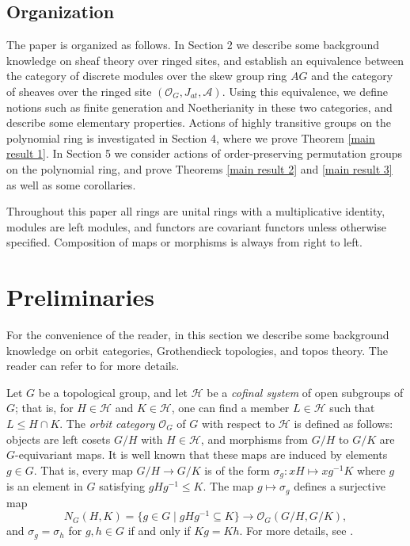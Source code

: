 \documentclass[11pt, reqno]{amsart}
\theoremstyle{plain}
\numberwithin{equation}{section}
\theoremstyle{definition}
\begin{document}
\subsection{Organization}

The paper is organized as follows. In Section 2 we describe some background knowledge on sheaf theory over ringed sites, and establish an equivalence between the category of discrete modules over the skew group ring $AG$ and the category of sheaves over the ringed site $(\mathcal{O}_G, J_{at}, \mathcal{A})$. Using this equivalence, we define notions such as finite generation and Noetherianity in these two categories, and describe some elementary properties. Actions of highly transitive groups on the polynomial ring is investigated in Section 4, where we prove Theorem \ref{main result 1}. In Section 5 we consider actions of order-preserving permutation groups on the polynomial ring, and prove Theorems \ref{main result 2} and \ref{main result 3} as well as some corollaries.

Throughout this paper all rings are unital rings with a multiplicative identity, modules are left modules, and functors are covariant functors unless otherwise specified. Composition of maps or morphisms is always from right to left.


\section{Preliminaries}

For the convenience of the reader, in this section we describe some background knowledge on orbit categories, Grothendieck topologies, and topos theory. The reader can refer to \cite{Ar, AGV, Car, Jo, KS, MM} for more details.

Let $G$ be a topological group, and let $\mathcal{H}$ be a \textit{cofinal system} of open subgroups of $G$; that is, for $H \in \mathcal{H}$ and $K \in \mathcal{H}$, one can find a member $L \in \mathcal{H}$ such that $L \leqslant H \cap K$. The \textit{orbit category} $\mathcal{O}_G$ of $G$ with respect to $\mathcal{H}$ is defined as follows: objects are left cosets $G/H$ with $H \in \mathcal{H}$, and morphisms from $G/H$ to $G/K$ are $G$-equivariant maps. It is well known that these maps are induced by elements $g \in G$. That is, every map $G/H \to G/K$ is of the form $\sigma_g: xH \mapsto xg^{-1}K$ where $g$ is an element in $G$ satisfying $gHg^{-1} \leqslant K$. The map $g \mapsto \sigma_g$ defines a surjective map
\[
N_G(H, K) = \{g \in G \mid gHg^{-1} \subseteq K \} \longrightarrow \mathcal{O}_G(G/H, G/K),
\]
and $\sigma_g = \sigma_h$ for $g, h \in G$ if and only if $Kg = Kh$. For more details, see \cite[Section 2]{Webb}.
\end{document}
